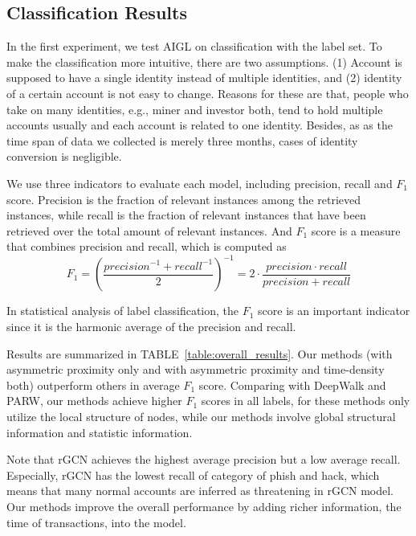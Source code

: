 \subsection{Classification Results}
In the first experiment, we test AIGL on classification with the label set. To make the classification more intuitive, there are two assumptions. (1) Account is supposed to have a single identity instead of multiple identities, and (2) identity of a certain account is not easy to change. Reasons for these are that, people who take on many identities, e.g., miner and investor both, tend to hold multiple accounts usually and each account is related to one identity. Besides, as as the time span of data we collected is merely three months, cases of identity conversion is negligible.

We use three indicators to evaluate each model, including precision, recall and $F_1$ score. Precision is the fraction of relevant instances among the retrieved instances, while recall is the fraction of relevant instances that have been retrieved over the total amount of relevant instances. And $F_1$ score is a measure that combines precision and recall, which is computed as
\begin{equation}
F_1=(\frac{{precision}^{-1}+{recall}^{-1}}{2})^{-1}=2\cdot\frac{precision \cdot recall}{precision + recall}
\end{equation}

In statistical analysis of label classification, the $F_1$ score is an important indicator since it is the harmonic average of the precision and recall.

Results are summarized in TABLE~\ref{table:overall_results}. Our methods (with asymmetric proximity only and with asymmetric proximity and time-density both) outperform others in average $F_1$ score. Comparing with DeepWalk and PARW, our methods achieve higher $F_1$ scores in all labels, for these methods only utilize the local structure of nodes, while our methods involve global structural information and statistic information.

Note that rGCN achieves the highest average precision but a low average recall. Especially, rGCN has the lowest recall of category of phish and hack, which means that many normal accounts are inferred as threatening in rGCN model. Our methods improve the overall performance by adding richer information, the time of transactions, into the model.

